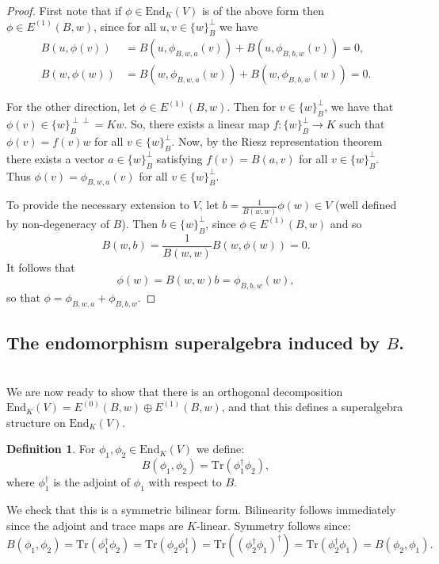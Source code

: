 \documentclass{amsart}
\theoremstyle{plain}
\theoremstyle{definition}
\newtheorem{defn}[theorem]{Definition}
\begin{document}
\begin{proof}
First note that if $\phi\in\text{End}_K(V)$ is of the above form then $\phi\in E^{(1)}(B,w)$, since for all $u,v\in\{w\}_B^{\perp}$ we have
\begin{align*}
    B(u, \phi(v)) &= B(u, \phi_{B,w,a}(v)) + B(u,\phi_{B,b,w}(v)) = 0, \\
    B(w, \phi(w)) &= B(w, \phi_{B,w,a}(w)) + B(w,\phi_{B,b,w}(w)) = 0.
\end{align*}

For the other direction, let $\phi \in E^{(1)}(B,w)$. Then for $v \in \{w\}_B^\perp$, we have that $\phi(v) \in \{w\}_B^{\perp \perp}=Kw$. So, there exists a linear map $f: \{w\}_B^\perp \rightarrow K$ such that $\phi(v)=f(v)w$ for all $v \in \{w\}_B^\perp$. Now, by the Riesz representation theorem there exists a vector $a \in \{w\}_B^\perp$ satisfying $f(v)=B(a,v)$ for all $v \in \{w\}_B^\perp$.  Thus $\phi(v) = \phi_{B,w,a}(v)$ for all $v\in\{w\}_B^{\perp}$.

To provide the necessary extension to $V$, let $b = \frac{1}{B(w,w)}\phi(w)\in V$ (well defined by non-degeneracy of $B$). Then $b \in \{w\}_B^\perp$, since $\phi \in E^{(1)}(B,w)$ and so
\begin{equation*}
    B(w,b) = \frac{1}{B(w,w)}B(w,\phi(w)) = 0.
\end{equation*}
It follows that \[\phi(w) = B(w,w)b = \phi_{B,b,w}(w),\] so that $\phi = \phi_{B,w,a}+\phi_{B,b,w}$.


\end{proof}

\subsection{The endomorphism superalgebra induced by $B$.}
\hfill\\

We are now ready to show that there is an orthogonal decomposition $\text{End}_K(V) = E^{(0)}(B,w)\oplus E^{(1)}(B,w)$, and that this defines a superalgebra structure on $\text{End}_K(V)$.

\begin{defn}
\label{def:bfend}
For $\phi_1, \phi_2\in\text{End}_K(V)$ we define: \[B(\phi_1, \phi_2) = \text{Tr}(\phi_1^\dagger\phi_2),\] where $\phi_1^{\dagger}$ is the adjoint of $\phi_1$ with respect to $B$.
\end{defn}

We check that this is a symmetric bilinear form. Bilinearity follows immediately since the adjoint and trace maps are $K$-linear. Symmetry follows since:
\begin{equation*}
    B(\phi_1, \phi_2) = \text{Tr}(\phi_1^\dagger\phi_2) = \text{Tr}(\phi_2\phi_1^\dagger)=\text{Tr}((\phi_2^\dagger\phi_1)^\dagger)= \text{Tr}(\phi_2^\dagger\phi_1) =  B(\phi_2,\phi_1).
\end{equation*}
\end{document}
